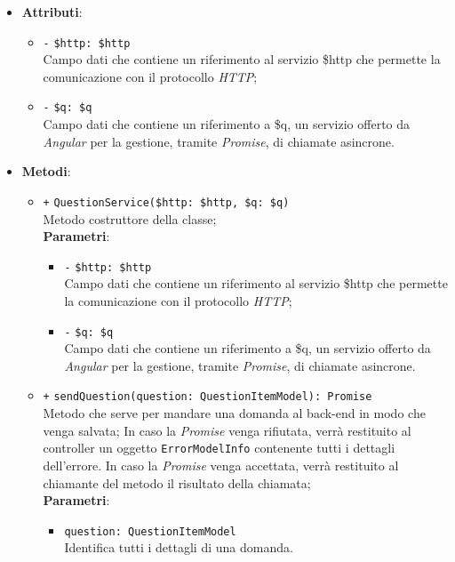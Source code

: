 \begin{itemize}
\begin{itemize}
	\end{itemize}
	\item \textbf{Attributi}:
	\begin{itemize}
		\item \texttt{-} \texttt{\$http: \$http} \\ Campo dati che contiene un riferimento al servizio \$http che permette la comunicazione con il protocollo \textit{HTTP};
		\item \texttt{-} \texttt{\$q: \$q} \\ Campo dati che contiene un riferimento a \$q, un servizio offerto da \textit{Angular} per la gestione, tramite \textit{Promise}, di chiamate asincrone.
	\end{itemize}
	\item \textbf{Metodi}:
	\begin{itemize}
		\item \texttt{+} \texttt{QuestionService(\$http: \$http, \$q: \$q)} \\ Metodo costruttore della classe; \\
		\textbf{Parametri}:
		\begin{itemize}
			\item \texttt{-} \texttt{\$http: \$http} \\ Campo dati che contiene un riferimento al servizio \$http che permette la comunicazione con il protocollo \textit{HTTP};
			\item \texttt{-} \texttt{\$q: \$q} \\ Campo dati che contiene un riferimento a \$q, un servizio offerto da \textit{Angular} per la gestione, tramite \textit{Promise}, di chiamate asincrone.
		\end{itemize}
		\item \texttt{+} \texttt{sendQuestion(question: QuestionItemModel): Promise} \\Metodo che serve per mandare una domanda al back-end in modo che venga salvata; In caso la \textit{Promise} venga rifiutata, verrà restituito al controller un oggetto \texttt{ErrorModelInfo} contenente tutti i dettagli dell'errore. In caso la \textit{Promise} venga accettata, verrà restituito al chiamante del metodo il risultato della chiamata;\\
		\textbf{Parametri}: 
		\begin{itemize}
			\item \texttt{question: QuestionItemModel} \\ Identifica tutti i dettagli di una domanda.

\end{itemize}
\end{itemize}
\end{itemize}
